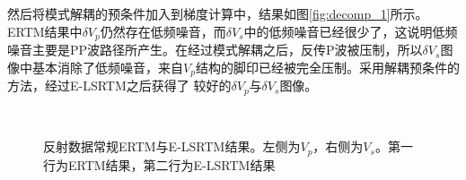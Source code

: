 然后将模式解耦的预条件加入到梯度计算中，结果如图\ref{fig:decomp_1}所示。ERTM结果中$\delta
V_p$仍然存在低频噪音，而$\delta
V_s$中的低频噪音已经很少了，这说明低频噪音主要是PP波路径所产生。在经过模式解耦之后，反传P波被压制，所以$\delta
V_s$图像中基本消除了低频噪音，来自$V_p$结构的脚印已经被完全压制。采用解耦预条件的方法，经过E-LSRTM之后获得了
较好的$\delta V_p$与$\delta V_s$图像。
\begin{figure}[!htb]
   \centering
   \\
   \caption{反射数据常规ERTM与E-LSRTM结果。左侧为$V_p$，右侧为$V_s$。第一行为ERTM结果，第二行为E-LSRTM结果}
   \label{fig:RTM_1_refl}
\end{figure}

